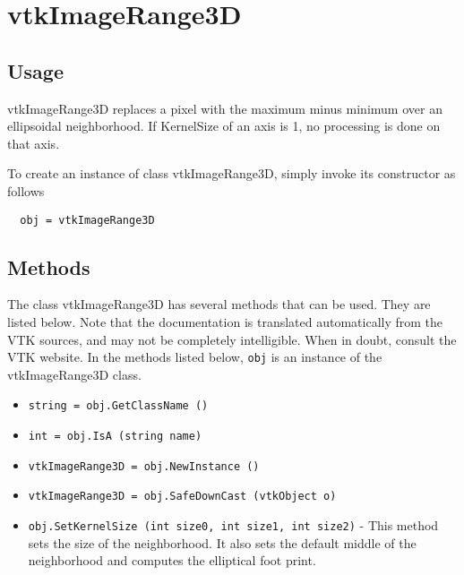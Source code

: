 \section{vtkImageRange3D}

\subsection{Usage}

 vtkImageRange3D replaces a pixel with the maximum minus minimum over
 an ellipsoidal neighborhood.  If KernelSize of an axis is 1, no processing
 is done on that axis.

To create an instance of class vtkImageRange3D, simply
invoke its constructor as follows
\begin{verbatim}
  obj = vtkImageRange3D
\end{verbatim}
\subsection{Methods}

The class vtkImageRange3D has several methods that can be used.
  They are listed below.
Note that the documentation is translated automatically from the VTK sources,
and may not be completely intelligible.  When in doubt, consult the VTK website.
In the methods listed below, \verb|obj| is an instance of the vtkImageRange3D class.
\begin{itemize}
\item  \verb|string = obj.GetClassName ()|

\item  \verb|int = obj.IsA (string name)|

\item  \verb|vtkImageRange3D = obj.NewInstance ()|

\item  \verb|vtkImageRange3D = obj.SafeDownCast (vtkObject o)|

\item  \verb|obj.SetKernelSize (int size0, int size1, int size2)| -  This method sets the size of the neighborhood.  It also sets the 
 default middle of the neighborhood and computes the elliptical foot print.

\end{itemize}
